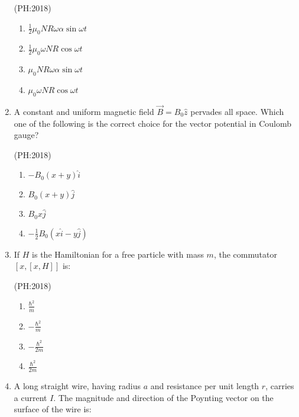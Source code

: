 \documentclass[journal,12pt,onecolumn]{IEEEtran}
\theoremstyle{remark}
\begin{document}
\begin{enumerate}
    \hfill{(PH:2018)}
		\begin{multicols}{2}
    \begin{enumerate}
        \item $\frac{1}{2} \mu_0 N R \omega \alpha \sin \omega t$
        \item $\frac{1}{2} \mu_0 \omega N R \cos \omega t$
        \item $\mu_0 N R \omega \alpha \sin \omega t$
        \item $\mu_0 \omega N R \cos \omega t$
    \end{enumerate}
\end{multicols}

    \item A constant and uniform magnetic field $\vec{B} = B_0 \hat{z}$ pervades all space. Which one of the following is the correct choice for the vector potential in Coulomb gauge?

    \hfill{(PH:2018)}
		\begin{multicols}{4}
    \begin{enumerate}
        \item $-B_0(x + y)\hat{i}$
        \item $B_0(x + y)\hat{j}$
        \item $B_0 x \hat{j}$
        \item $-\frac{1}{2} B_0 (x\hat{i} - y\hat{j})$
    \end{enumerate}
			\end{multicols}
    

    \item If $H$ is the Hamiltonian for a free particle with mass $m$, the commutator $[x, [x, H]]$ is:

    \hfill{(PH:2018)}
		\begin{multicols}{4}
    \begin{enumerate}
        \item $\frac{\hbar^2}{m}$
        \item $-\frac{\hbar^2}{m}$
        \item $-\frac{\hbar^2}{2m}$
        \item $\frac{\hbar^2}{2m}$
    \end{enumerate}
			\end{multicols}
 

    \item A long straight wire, having radius $a$ and resistance per unit length $r$, carries a current $I$. The magnitude and direction of the Poynting vector on the surface of the wire is:


\end{enumerate}
\end{document}
